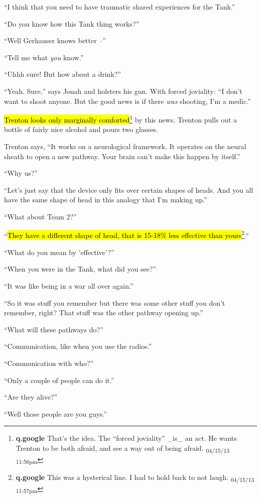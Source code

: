 ``I think that you need to have traumatic shared experiences for the Tank.''

``Do you know how this Tank thing works?''

``Well Gerhauser knows better --''

``Tell me what \textit{you} know.''

``Uhhh sure!  But how about a drink?''

``Yeah.  Sure,'' says Jonah and holsters his gun.  With forced joviality: ``I don't want to shoot anyone.  But the good news is if there \textit{was} shooting, I'm a medic.''

\hl{Trenton looks only marginally comforted}\footnote{\textbf{q.google }That's the idea.  The ``forced joviality'' \_is\_ an act.  He wants Trenton to be both afraid, and see a way out of being afraid. \textsubscript{04/15/13 11:56pm}} by this news.  Trenton pulls out a bottle of fairly nice alcohol and pours two glasses.

Trenton says, ``It works on a neurological framework.  It operates on the neural sheath to open a new pathway.  Your brain can't make this happen by itself.''

``Why us?''

``Let's just say that the device only fits over certain shapes of heads.  And you all have the same shape of head in this analogy that I'm making up.''

``What about Team 2?''

``\hl{They have a different shape of head, that is 15-18\% less effective than yours}\footnote{\textbf{q.google }This was a hysterical line.  I had to hold back to not laugh. \textsubscript{04/15/13 11:57pm}}.''

``What do you mean by 'effective'?''

``When you were in the Tank, what did you see?''

``It was like being in a war all over again.''

``So it was stuff you remember but there was some other stuff you don't remember, right?  That stuff was the other pathway opening up.''

``What will these pathways do?''

``Communication, like when you use the radios.''

``Communication with who?''

``Only a couple of people can do it.''

``Are they alive?''

``Well those people are you guys.''

